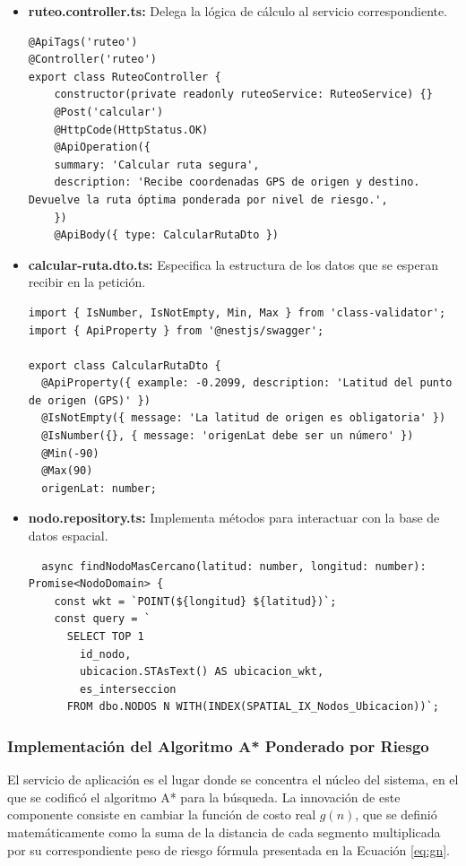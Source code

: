 \begin{itemize}
    \item \textbf{ruteo.controller.ts:} Delega la lógica de cálculo al servicio correspondiente.
\begin{lstlisting}
@ApiTags('ruteo')
@Controller('ruteo')
export class RuteoController {
    constructor(private readonly ruteoService: RuteoService) {}
    @Post('calcular')
    @HttpCode(HttpStatus.OK)
    @ApiOperation({
    summary: 'Calcular ruta segura',
    description: 'Recibe coordenadas GPS de origen y destino. Devuelve la ruta óptima ponderada por nivel de riesgo.',
    })
    @ApiBody({ type: CalcularRutaDto })
\end{lstlisting}
    \item \textbf{calcular-ruta.dto.ts:} Especifica la estructura de los datos que se esperan recibir en la petición.
\begin{lstlisting}
import { IsNumber, IsNotEmpty, Min, Max } from 'class-validator';
import { ApiProperty } from '@nestjs/swagger';

export class CalcularRutaDto {
  @ApiProperty({ example: -0.2099, description: 'Latitud del punto de origen (GPS)' })
  @IsNotEmpty({ message: 'La latitud de origen es obligatoria' })
  @IsNumber({}, { message: 'origenLat debe ser un número' })
  @Min(-90)
  @Max(90)
  origenLat: number;
\end{lstlisting}
    
    \item \textbf{nodo.repository.ts:} Implementa métodos para interactuar con la base de datos espacial.
\begin{lstlisting}
  async findNodoMasCercano(latitud: number, longitud: number): Promise<NodoDomain> {
    const wkt = `POINT(${longitud} ${latitud})`;
    const query = `
      SELECT TOP 1
        id_nodo,
        ubicacion.STAsText() AS ubicacion_wkt,
        es_interseccion
      FROM dbo.NODOS N WITH(INDEX(SPATIAL_IX_Nodos_Ubicacion))`;
\end{lstlisting}   
\end{itemize}

\subsubsection{Implementación del Algoritmo A* Ponderado por Riesgo}

El servicio de aplicación es el lugar donde se concentra el núcleo del sistema, en el que se codificó el algoritmo A* para la búsqueda. La innovación de este componente consiste en cambiar la función de costo real $g(n)$, que se definió matemáticamente como la suma de la distancia de cada segmento multiplicada por su correspondiente peso de riesgo fórmula presentada en la Ecuación \ref{eq:gn}.

